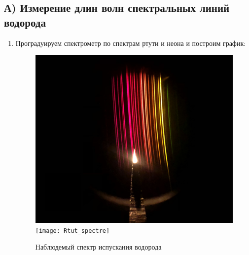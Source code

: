 \documentclass[14pt, a4paper]{extarticle}
\begin{document}
 \subsection*{А) Измерение длин волн спектральных линий водорода}
 \begin{enumerate}
 	\item Проградуируем спектрометр по спектрам ртути и неона и построим график:
 	\clearpage
 	\begin{figure}[h!]
 		\centering
 		\includegraphics[width = 0.4\linewidth]{Neon_spectre}
 		\texttt{[image: Rtut\_spectre]}
 		\caption{Наблюдемый спектр испускания водорода}
 	\end{figure}


\end{enumerate}
\end{document}
